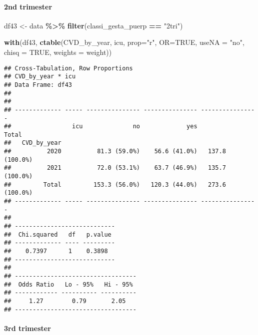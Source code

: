 \documentclass[
]{article}
\newenvironment{Shaded}{\begin{snugshade}}{\end{snugshade}}
\newcommand{\AttributeTok}[1]{\textcolor[rgb]{0.13,0.29,0.53}{#1}}
\newcommand{\ConstantTok}[1]{\textcolor[rgb]{0.56,0.35,0.01}{#1}}
\newcommand{\FunctionTok}[1]{\textcolor[rgb]{0.13,0.29,0.53}{\textbf{#1}}}
\newcommand{\NormalTok}[1]{#1}
\newcommand{\OtherTok}[1]{\textcolor[rgb]{0.56,0.35,0.01}{#1}}
\newcommand{\SpecialCharTok}[1]{\textcolor[rgb]{0.81,0.36,0.00}{\textbf{#1}}}
\newcommand{\StringTok}[1]{\textcolor[rgb]{0.31,0.60,0.02}{#1}}
\begin{document}
\hypertarget{nd-trimester-9}{%
\paragraph{\texorpdfstring{{ 2nd trimester
}}{ 2nd trimester }}\label{nd-trimester-9}}

\begin{Shaded}
\begin{Highlighting}[]
\NormalTok{df43 }\OtherTok{\textless{}{-}}\NormalTok{ data }\SpecialCharTok{\%\textgreater{}\%} 
  \FunctionTok{filter}\NormalTok{(classi\_gesta\_puerp }\SpecialCharTok{==} \StringTok{"2tri"}\NormalTok{)}

\FunctionTok{with}\NormalTok{(df43, }\FunctionTok{ctable}\NormalTok{(CVD\_by\_year, icu, }\AttributeTok{prop=}\StringTok{"r"}\NormalTok{, }\AttributeTok{OR=}\ConstantTok{TRUE}\NormalTok{, }\AttributeTok{useNA =} \StringTok{"no"}\NormalTok{, }\AttributeTok{chisq =} \ConstantTok{TRUE}\NormalTok{,  }\AttributeTok{weights =}\NormalTok{ weight))}
\end{Highlighting}
\end{Shaded}

\begin{verbatim}
## Cross-Tabulation, Row Proportions  
## CVD_by_year * icu  
## Data Frame: df43  
## 
## 
## ------------- ----- --------------- --------------- ----------------
##                 icu              no             yes            Total
##   CVD_by_year                                                       
##          2020          81.3 (59.0%)    56.6 (41.0%)   137.8 (100.0%)
##          2021          72.0 (53.1%)    63.7 (46.9%)   135.7 (100.0%)
##         Total         153.3 (56.0%)   120.3 (44.0%)   273.6 (100.0%)
## ------------- ----- --------------- --------------- ----------------
## 
## ----------------------------
##  Chi.squared   df   p.value 
## ------------- ---- ---------
##    0.7397      1    0.3898  
## ----------------------------
## 
## ----------------------------------
##  Odds Ratio   Lo - 95%   Hi - 95% 
## ------------ ---------- ----------
##     1.27        0.79       2.05   
## ----------------------------------
\end{verbatim}

\hypertarget{rd-trimester-9}{%
\paragraph{\texorpdfstring{{ 3rd trimester
}}{ 3rd trimester }}\label{rd-trimester-9}}
\end{document}
